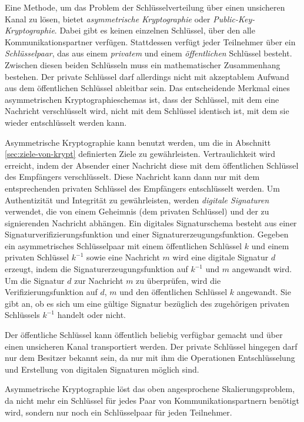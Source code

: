 Eine Methode, um das Problem der Schlüsselverteilung über einen
unsicheren Kanal zu lösen, bietet \emph{asymmetrische Kryptographie}
oder \emph{Public-Key-Kryptographie}. Dabei gibt es keinen einzelnen
Schlüssel, über den alle Kommunikationspartner
verfügen. Stattdessen verfügt jeder Teilnehmer über ein
\emph{Schlüsselpaar}, das aus einem \emph{privatem} und einem
\emph{öffentlichen} Schlüssel besteht. Zwischen diesen beiden
Schlüsseln muss ein mathematischer Zusammenhang bestehen. Der
private Schlüssel darf allerdings nicht mit akzeptablem Aufwand aus
dem öffentlichen Schlüssel ableitbar sein. Das entscheidende
Merkmal eines asymmetrischen Kryptographieschemas ist, dass der
Schlüssel, mit dem eine Nachricht verschlüsselt wird, nicht mit
dem Schlüssel identisch ist, mit dem sie wieder entschlüsselt
werden kann.

Asymmetrische Kryptographie kann benutzt werden, um die in Abschnitt
\ref{sec:ziele-von-krypt} definierten Ziele zu
gewährleisten. Vertraulichkeit wird erreicht, indem der Absender
einer Nachricht diese mit dem öffentlichen Schlüssel des
Empfängers verschlüsselt. Diese Nachricht kann dann nur mit dem
entsprechenden privaten Schlüssel des Empfängers entschlüsselt
werden. Um Authentizität und Integrität zu
gewährleisten, werden \emph{digitale Signaturen} verwendet, die von
einem Geheimnis (dem privaten Schlüssel) und der zu signierenden
Nachricht abhängen. Ein digitales Signaturschema besteht aus einer
Signaturverifizierungsfunktion und einer
Signaturerzeugungsfunktion. Gegeben ein asymmetrisches Schlüsselpaar
mit einem öffentlichen Schlüssel $k$ und einem privaten
Schlüssel $k^{-1}$ sowie eine Nachricht $m$ wird eine digitale
Signatur $d$ erzeugt, indem die Signaturerzeugungsfunktion auf
$k^{-1}$ und $m$ angewandt wird. Um die Signatur $d$ zur Nachricht $m$
zu überprüfen, wird die Verifizierungsfunktion auf $d$, $m$ und
den öffentlichen Schlüssel $k$ angewandt. Sie gibt an, ob es sich
um eine gültige Signatur bezüglich des zugehörigen privaten
Schlüssels $k^{-1}$ handelt oder nicht.

Der öffentliche Schlüssel kann öffentlich beliebig verfügbar
gemacht und über einen unsicheren Kanal transportiert werden. Der
private Schlüssel hingegen darf nur dem Besitzer bekannt sein, da
nur mit ihm die Operationen Entschlüsselung und Erstellung von
digitalen Signaturen möglich sind.

Asymmetrische Kryptographie löst das oben angesprochene
Skalierungsproblem, da nicht mehr ein Schlüssel für jedes Paar von
Kommunikationspartnern benötigt wird, sondern nur noch ein
Schlüsselpaar für jeden Teilnehmer.

